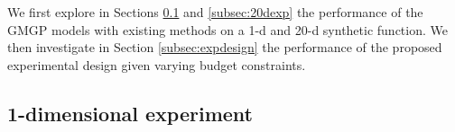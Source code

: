 \documentclass[12pt]{article}
\begin{document}
\noindent We first explore in Sections \ref{subsec:1dexp} and \ref{subsec:20dexp} the performance of the GMGP models with existing methods on a 1-d and 20-d synthetic function. We then investigate in Section \ref{subsec:expdesign} the performance of the proposed experimental design given varying budget constraints.




\subsection{1-dimensional experiment}
\label{subsec:1dexp}
\end{document}
